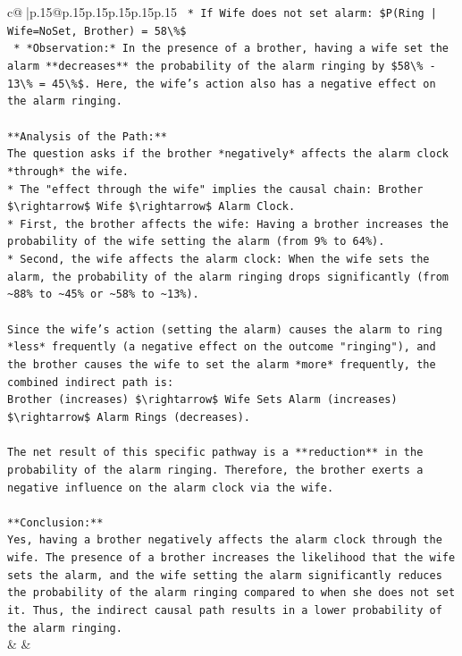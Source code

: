 \documentclass{article}
\begin{document}
{\begin{supertabular}{c@{$\;$}|p{.15\linewidth}@{}p{.15\linewidth}p{.15\linewidth}p{.15\linewidth}p{.15\linewidth}p{.15\linewidth}}
{{{\texttt{    *   If Wife does not set alarm: \$P(Ring | Wife=NoSet, Brother) = 58\textbackslash{}\%\$} \\
\texttt{    *   *Observation:* In the presence of a brother, having a wife set the alarm **decreases** the probability of the alarm ringing by \$58\textbackslash{}\% {-} 13\textbackslash{}\% = 45\textbackslash{}\%\$. Here, the wife's action also has a negative effect on the alarm ringing.} \\
\\ 
\texttt{**Analysis of the Path:**} \\
\texttt{The question asks if the brother *negatively* affects the alarm clock *through* the wife.} \\
\texttt{*   The "effect through the wife" implies the causal chain: Brother \$\textbackslash{}rightarrow\$ Wife \$\textbackslash{}rightarrow\$ Alarm Clock.} \\
\texttt{*   First, the brother affects the wife: Having a brother increases the probability of the wife setting the alarm (from 9\% to 64\%).} \\
\texttt{*   Second, the wife affects the alarm clock: When the wife sets the alarm, the probability of the alarm ringing drops significantly (from \textasciitilde{}88\% to \textasciitilde{}45\% or \textasciitilde{}58\% to \textasciitilde{}13\%).} \\
\\ 
\texttt{Since the wife's action (setting the alarm) causes the alarm to ring *less* frequently (a negative effect on the outcome "ringing"), and the brother causes the wife to set the alarm *more* frequently, the combined indirect path is:} \\
\texttt{Brother (increases) \$\textbackslash{}rightarrow\$ Wife Sets Alarm (increases) \$\textbackslash{}rightarrow\$ Alarm Rings (decreases).} \\
\\ 
\texttt{The net result of this specific pathway is a **reduction** in the probability of the alarm ringing. Therefore, the brother exerts a negative influence on the alarm clock via the wife.} \\
\\ 
\texttt{**Conclusion:**} \\
\texttt{Yes, having a brother negatively affects the alarm clock through the wife. The presence of a brother increases the likelihood that the wife sets the alarm, and the wife setting the alarm significantly reduces the probability of the alarm ringing compared to when she does not set it. Thus, the indirect causal path results in a lower probability of the alarm ringing.} \\
            }
        }
    }
    & & \\ \\


\end{supertabular}}
\end{document}
